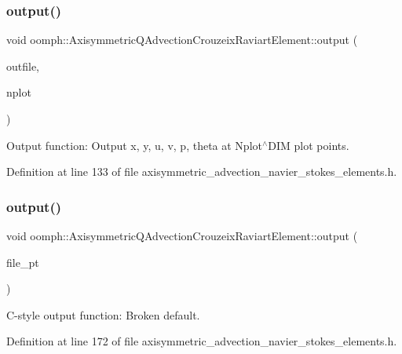 \subsubsection{\texorpdfstring{output()}{output()}\hspace{0.1cm}{\footnotesize\ttfamily [2/4]}}
{\footnotesize\ttfamily void oomph\+::\+Axisymmetric\+Q\+Advection\+Crouzeix\+Raviart\+Element\+::output (\begin{DoxyParamCaption}\item[{std\+::ostream \&}]{outfile,  }\item[{const unsigned \&}]{nplot }\end{DoxyParamCaption})\hspace{0.3cm}{\ttfamily [inline]}}



Output function\+: Output x, y, u, v, p, theta at Nplot$^\wedge$\+D\+IM plot points. 



Definition at line 133 of file axisymmetric\+\_\+advection\+\_\+navier\+\_\+stokes\+\_\+elements.\+h.

\mbox{\label{classoomph_1_1AxisymmetricQAdvectionCrouzeixRaviartElement_ade2a7eba4740381ed2935149933b9efe}} 
\subsubsection{\texorpdfstring{output()}{output()}\hspace{0.1cm}{\footnotesize\ttfamily [3/4]}}
{\footnotesize\ttfamily void oomph\+::\+Axisymmetric\+Q\+Advection\+Crouzeix\+Raviart\+Element\+::output (\begin{DoxyParamCaption}\item[{F\+I\+LE $\ast$}]{file\+\_\+pt }\end{DoxyParamCaption})\hspace{0.3cm}{\ttfamily [inline]}}



C-\/style output function\+: Broken default. 



Definition at line 172 of file axisymmetric\+\_\+advection\+\_\+navier\+\_\+stokes\+\_\+elements.\+h.

